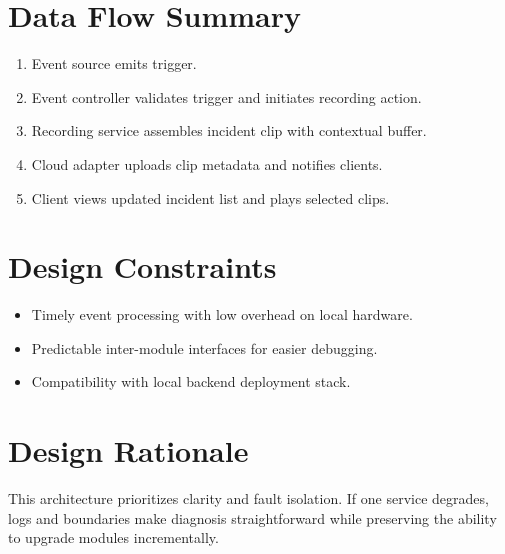 \section{Data Flow Summary}
\begin{enumerate}
\item Event source emits trigger.
\item Event controller validates trigger and initiates recording action.
\item Recording service assembles incident clip with contextual buffer.
\item Cloud adapter uploads clip metadata and notifies clients.
\item Client views updated incident list and plays selected clips.
\end{enumerate}

\section{Design Constraints}
\begin{itemize}
\item Timely event processing with low overhead on local hardware.
\item Predictable inter-module interfaces for easier debugging.
\item Compatibility with local backend deployment stack.
\end{itemize}

\section{Design Rationale}
This architecture prioritizes clarity and fault isolation. If one service degrades, logs and boundaries make diagnosis straightforward while preserving the ability to upgrade modules incrementally.